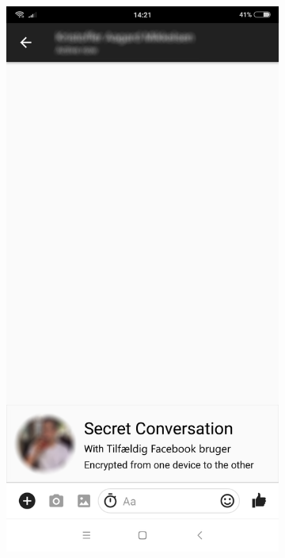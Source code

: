 \begin{figure}[H]
\begin{subfigure}{0.33\textwidth}
        \caption{}
        \label{fig:}
    \end{subfigure}
    \begin{center}
        \begin{subfigure}{0.33\textwidth}
            \centering
            \includegraphics[scale=0.15]{Projectdoc/Problemanalyse/Illustrationer/4-fbchat.png} 

\end{subfigure}
\end{center}
\end{figure}

